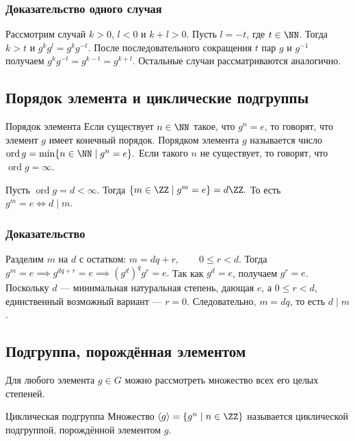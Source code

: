 \subsubsection*{Доказательство одного случая}

Рассмотрим случай $k > 0$, $l < 0$ и $k+l > 0$. Пусть $l = -t$, где $t \in \NN$. Тогда $k > t$ и $g^kg^l = g^kg^{-t}.$
После последовательного сокращения $t$ пар $g$ и $g^{-1}$ получаем $g^kg^{-t} = g^{k-t} = g^{k+l}.$
Остальные случаи рассматриваются аналогично.

\subsection{Порядок элемента и циклические подгруппы}

\begin{Definition}{Порядок элемента}{}
	Если существует $n \in \NN$ такое, что $g^n = e$, то говорят, что элемент $g$ имеет конечный порядок. Порядком элемента $g$ называется число $\operatorname{ord} g = \min\{n \in \NN \mid g^n = e\}.$
	Если такого $n$ не существует, то говорят, что $\operatorname{ord} g = \infty.$
\end{Definition}

\begin{Proposition}{}{}
	Пусть $\operatorname{ord} g = d < \infty$. Тогда $\{m \in \ZZ \mid g^m = e\} = d\ZZ.$
	То есть $g^m = e \iff d \mid m.$
\end{Proposition}

\subsubsection*{Доказательство}

Разделим $m$ на $d$ с остатком: $m = dq + r, \qquad 0 \le r < d.$
Тогда $g^m = e \implies g^{dq+r} = e \implies (g^d)^qg^r = e.$
Так как $g^d = e$, получаем $g^r = e$. Поскольку $d$ — минимальная натуральная степень, дающая $e$, а $0 \le r < d$, единственный возможный вариант — $r = 0$. Следовательно, $m = dq$, то есть $d \mid m$.

\subsection{Подгруппа, порождённая элементом}

Для любого элемента $g \in G$ можно рассмотреть множество всех его целых степеней.

\begin{Definition}{Циклическая подгруппа}{}
	Множество $\langle g \rangle = \{g^n \mid n \in \ZZ\}$
	называется циклической подгруппой, порождённой элементом $g$.
\end{Definition}

